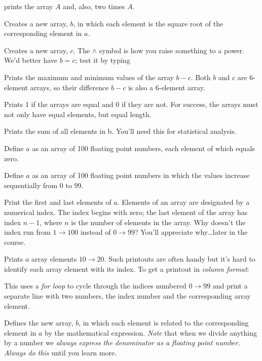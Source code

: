 \documentclass[psfig,preprint]{aastex}
\begin{document}
 prints the array $A$ and, also, two times
$A$. 

 Creates a new array, $b$, in which each
element is the square root of the corresponding element in $a$. 

 Creates a new array, $c$.  The
$\wedge$ symbol is how you raise something to a power.  We'd better have
$b=c$; test it by typing

 Prints the maximum
and minimum values of the array $b-c$.  Both $b$ and $c$ are 6-element
arrays, so their difference $b-c$ is also a 6-element array. 

 Prints 1 if the arrays are equal
and 0 if they are not. For success, the arrays must not only have equal
elements, but equal length.

 Prints the sum of all elements in b.
You'll need this for statistical analysis. 


 Define $a$ as an array of 100 floating
point numbers, each element of which equals zero. 

 Define $a$ as an array of 100 floating
point numbers in which the values increase sequentially from 0 to 99. 

 Print the first and last elements of
$a$.  Elements of an array are designated by a numerical index.  The
index begins with zero; the last element of the array has index $n-1$,
where $n$ is the number of elements in the array.  Why doesn't the index
run from $1 \rightarrow 100$ instead of $0 \rightarrow 99$? You'll
appreciate why\dots later in the course. 

 Prints $a$ array elements $10
\rightarrow 20$. Such printouts are often handy but it's hard to
identify each array element with its index. To get a printout in {\it
column format}:

 This uses a {\it for
loop} to cycle through the indices numbered $0 \rightarrow 99$ and print
a separate line with two numbers, the index number and the corresponding
array element.

 Defines the new array, $b$, in
which each element is related to the corresponding element in $a$ by the
mathematical expression.  {\it Note} that when we divide anything by a
number we {\it always express the denominator as a floating point
number}.  {\it Always do this} until you learn more. 
\end{document}
